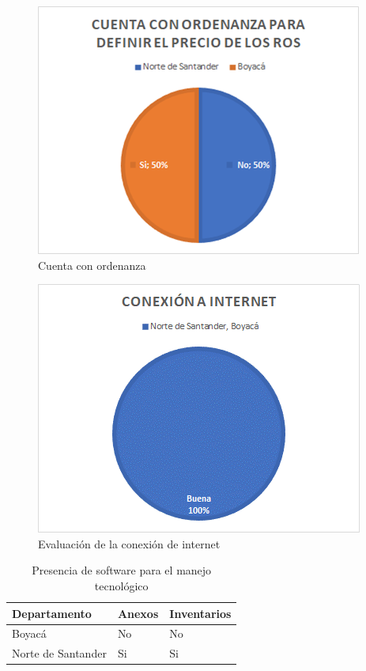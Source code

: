 \documentclass[
]{book}
\begin{document}
\begin{figure}
\includegraphics[width=0.85\linewidth]{figures/Imagen5} \caption{Cuenta con ordenanza}\label{fig:CuentasOrdenanza1}
\end{figure}

\begin{figure}
\includegraphics[width=0.85\linewidth]{figures/Imagen6} \caption{Evaluación de la conexión de internet}\label{fig:ConexionInternetRecRegAndinaNorte}
\end{figure}

\begin{longtable}[t]{lll}
\caption{\label{tab:softwareTecnologia}Presencia de software para el manejo tecnológico}\\
\toprule
Departamento & Anexos & Inventarios\\
\midrule
Boyacá & No & No\\
Norte de Santander & Si & Si\\
\bottomrule
\end{longtable}
\end{document}
